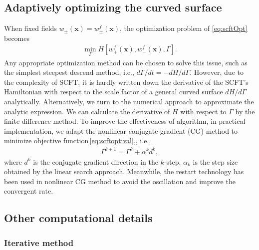 \documentclass[final,1p,times]{elsarticle}
\newcommand{\bx}{\mathbf{x}}
\begin{document}
\subsection{Adaptively optimizing the curved surface}
\label{subsec:adjustBox}

When fixed fields $w_\pm(\bx)=w_\pm^f(\bx)$, the optimization
problem of \eqref{eq:scftOpt} becomes 
\begin{align}
    \min_{\Gamma}H[w_+^f(\bx), w_-^f(\bx), \Gamma].
	\label{eq:scftoptival}
\end{align}
Any appropriate optimization method can be chosen to solve this
issue, such as the simplest steepest descend method, i.e.,
$d\Gamma/dt = -dH/d\Gamma$.
However, due to the complexity of SCFT, it is hardly written
down the derivative of the
SCFT's Hamiltonian with respect to the scale factor of a general
curved surface $d H/d \Gamma$ analytically.
Alternatively, we turn to the numerical approach to approximate
the analytic expression. We can calculate the
derivative of $H$ with respect to $\Gamma$ by the finite
difference method. 
To improve the effectiveness of algorithm, in practical
implementation, we adapt the nonlinear conjugate-gradient
(CG) method to minimize objective
function\,\eqref{eq:scftoptival},\cite{nocedal2006numerical}, i.e.,
\begin{align}
	\Gamma^{k+1} = \Gamma^{k} + \alpha^k d^k,
  \label{eq:adjustR}
\end{align}
where $d^k$ is the conjugate gradient direction in the $k$-step.
$\alpha_k$ is the step size obtained by the linear search
approach. Meanwhile, the restart technology has been used in
nonlinear CG method to avoid the oscillation and improve the
convergent rate.

\subsection{Other computational details}
\label{subsec:otherdetail}

\subsubsection{Iterative method}
\label{subsubsec:euler}

\end{document}
